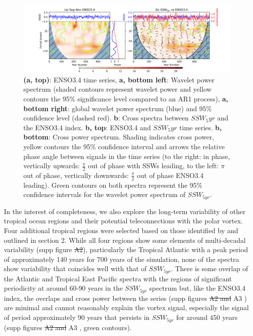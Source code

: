 \documentclass[wcd, manuscript]{copernicus}
\providecommand{\DIFadd}[1]{{\protect\color{blue}\uwave{#1}}} %
\providecommand{\DIFdel}[1]{{\protect\color{red}\sout{#1}}}                      %
\providecommand{\DIFaddbegin}{} %
\providecommand{\DIFaddend}{} %
\providecommand{\DIFdelbegin}{} %
\providecommand{\DIFdelend}{} %
\providecommand{\DIFaddbeginFL}{} %
\providecommand{\DIFaddendFL}{} %
\providecommand{\DIFdelbeginFL}{} %
\providecommand{\DIFdelendFL}{} %
\begin{document}
\begin{center}
\begin{figure}[h!]
\noindent\DIFdelbeginFL %
\DIFdelendFL \DIFaddbeginFL \includegraphics[width = \linewidth]{new_changed_figures/ENSO_wavelet_combined_new_levels.png}
\DIFaddendFL \caption{\textbf{(a, top)}: ENSO3.4 time series, \textbf{a, bottom left}: Wavelet power spectrum (shaded contours represent wavelet power and yellow contours the 95\% significance level compared to an AR1 process), \textbf{a, bottom right}: global wavelet power spectrum (blue) and 95\% confidence level (dashed red). \textbf{b}: Cross spectra between $SSW_5yr$ and the ENSO3.4 index. \textbf{b, top}: ENSO3.4 and $SSW_5yr$ time series. \textbf{b, bottom}: Cross power spectrum. Shading indicates cross power, yellow contours the 95\% confidence interval and arrows the relative phase angle between signals in the time series (to the right: in phase, vertically upwards: $\frac{\pi}{2}$ out of phase with SSWs leading, to the left: $\pi$ out of phase, vertically downwards: $\frac{\pi}{2}$ out of phase ENSO3.4 leading). Green contours on both spectra represent the 95\% confidence intervals for the wavelet power spectrum of $SSW_{5yr}$.}
\end{figure}
\end{center}

In the interest of completeness, we also explore the long-term variability of other tropical ocean regions and their potential teleconnections with the polar vortex. Four additional tropical regions were selected based on those identified by \cite{Scaife2016} and outlined in section 2. While all four regions show some elements of multi-decadal variability (supp figure \DIFdelbegin \DIFdel{A2}\DIFdelend \DIFaddbegin \DIFadd{A5}\DIFaddend ), particularly the Tropical Atlantic with a peak period of approximately 140 years for 700 years of the simulation, none of the spectra show variability that coincides well with that of $SSW_{5yr}$. There is some overlap of the Atlantic and Tropical East Pacific spectra with the regions of significant periodicity at around 60-90 years in the $SSW_{5yr}$ spectrum but, like the ENSO3.4 index, the overlaps and cross power between the series (supp figures \DIFdelbegin \DIFdel{A2 and }\DIFdelend A3 \DIFaddbegin \DIFadd{and A4}\DIFaddend ) are minimal and cannot reasonably explain the vortex signal, especially the signal of period approximately 90 years that persists in $SSW_{5yr}$ for around 450 years (supp figures \DIFdelbegin \DIFdel{A2 and }\DIFdelend A3 \DIFaddbegin \DIFadd{and A4}\DIFaddend , green contours).
\end{document}
